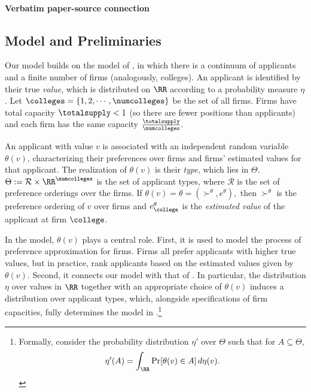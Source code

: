 \documentclass[10pt]{article}
\begin{document}
\paragraph{Verbatim paper-source connection}
\begin{ReviewVerbatim}
\section{Model and Preliminaries}
Our model builds on the model of \cite{azevedo2016supply}, in which there is a continuum of applicants and a finite number of firms (analogously, colleges). An applicant is identified by their true \textit{value}, which is distributed on $\RR$ according to a probability measure $\eta$. Let $\colleges = \{1, 2, \cdots, \numcolleges\}$ be the set of all firms. Firms have total capacity $\totalsupply < 1$ (so there are fewer positions than applicants) and each firm has the same capacity $\frac{\totalsupply}{\numcolleges}.$

An applicant with value $v$ is associated with an independent random variable $\theta(v)$, characterizing their preferences over firms and firms' estimated values for that applicant. The realization of $\theta(v)$ is their \textit{type}, which lies in $\Theta$. $\Theta := \mathcal{R} \times \RR^\numcolleges$ is the set of applicant types, where $\mathcal{R}$ is the set of preference orderings over the firms. If $\theta(v) = \theta = (\succ^\theta, e^\theta),$ then $\succ^\theta$ is the preference ordering of $v$ over firms and $e^\theta_\college$ is the \textit{estimated value} of the applicant at firm $\college$.

In the model, $\theta(v)$ plays a central role. First, it is used to model the process of preference approximation for firms. Firms all prefer applicants with higher true values, but in practice, rank applicants based on the estimated values given by $\theta(v)$. Second, it connects our model with that of \cite{azevedo2016supply}. In particular, the distribution $\eta$ over values in $\RR$ together with an appropriate choice of $\theta(v)$ induces a distribution over applicant types, which, alongside specifications of firm capacities, fully determines the model in \cite{azevedo2016supply}.\footnote{Formally, consider the probability distribution $\eta'$ over $\Theta$ such that for $A\subseteq \Theta$,
\begin{equation}
    \eta'(A) = \int_\RR \Pr[\theta(v)\in A]\,d\eta(v).
\end{equation}}


\end{ReviewVerbatim}
\end{document}
